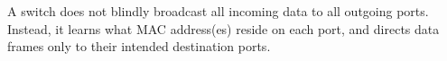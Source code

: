 
A switch does not blindly broadcast all incoming data to all outgoing ports.  Instead, it learns what MAC address(es) reside on each port, and directs data frames only to their intended destination ports.











